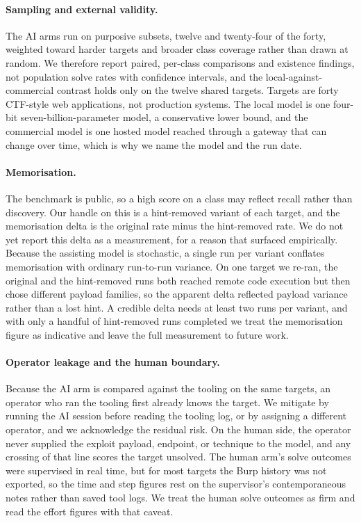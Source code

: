 \documentclass[11pt]{article}
\begin{document}
\paragraph{Sampling and external validity.}
The AI arms run on purposive subsets, twelve and twenty-four of the forty, weighted toward harder targets and broader class coverage rather than drawn at random. We therefore report paired, per-class comparisons and existence findings, not population solve rates with confidence intervals, and the local-against-commercial contrast holds only on the twelve shared targets. Targets are forty CTF-style web applications, not production systems. The local model is one four-bit seven-billion-parameter model, a conservative lower bound, and the commercial model is one hosted model reached through a gateway that can change over time, which is why we name the model and the run date.

\paragraph{Memorisation.}
The benchmark is public, so a high score on a class may reflect recall rather than discovery. Our handle on this is a hint-removed variant of each target, and the memorisation delta is the original rate minus the hint-removed rate. We do not yet report this delta as a measurement, for a reason that surfaced empirically. Because the assisting model is stochastic, a single run per variant conflates memorisation with ordinary run-to-run variance. On one target we re-ran, the original and the hint-removed runs both reached remote code execution but then chose different payload families, so the apparent delta reflected payload variance rather than a lost hint. A credible delta needs at least two runs per variant, and with only a handful of hint-removed runs completed we treat the memorisation figure as indicative and leave the full measurement to future work.

\paragraph{Operator leakage and the human boundary.}
Because the AI arm is compared against the tooling on the same targets, an operator who ran the tooling first already knows the target. We mitigate by running the AI session before reading the tooling log, or by assigning a different operator, and we acknowledge the residual risk. On the human side, the operator never supplied the exploit payload, endpoint, or technique to the model, and any crossing of that line scores the target unsolved. The human arm's solve outcomes were supervised in real time, but for most targets the Burp history was not exported, so the time and step figures rest on the supervisor's contemporaneous notes rather than saved tool logs. We treat the human solve outcomes as firm and read the effort figures with that caveat.
\end{document}
